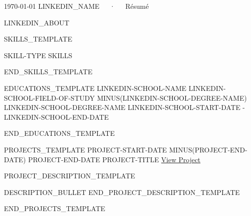\documentclass[10pt, a4paper]{awesome-cv}
\begin{document}
    \makecvheader[C]

    \makecvfooter
    {\today}
    {LINKEDIN_NAME~~~·~~~Résumé}
    {\thepage}



    \begin{cvparagraph}
        LINKEDIN_ABOUT
    \end{cvparagraph}


    SKILLS_TEMPLATE
    \begin{cvhonors}

        \cvhonor
        {SKILL-TYPE} %
        {SKILLS} %
        {} %
        {} %

    \end{cvhonors}
    END_SKILLS_TEMPLATE

    \begin{cventries}

        EDUCATIONS_TEMPLATE
        \cventry
        {LINKEDIN-SCHOOL-NAME}
        {LINKEDIN-SCHOOL-FIELD-OF-STUDY MINUS(LINKEDIN-SCHOOL-DEGREE-NAME) LINKEDIN-SCHOOL-DEGREE-NAME}
        {} %
        {LINKEDIN-SCHOOL-START-DATE - LINKEDIN-SCHOOL-END-DATE} %
        {
            \begin{cvitems} %
            \end{cvitems}
        }
        END_EDUCATIONS_TEMPLATE

    \end{cventries}

    \begin{cventries}


        PROJECTS_TEMPLATE
        \cventry
        {PROJECT-START-DATE MINUS(PROJECT-END-DATE) PROJECT-END-DATE}
        {PROJECT-TITLE} %
        {\href{PROJECT-LINK}{View Project}} %
        {}
        {
            \begin{cvitems} %
                PROJECT_DESCRIPTION_TEMPLATE
                \item {DESCRIPTION_BULLET}
                END_PROJECT_DESCRIPTION_TEMPLATE
            \end{cvitems}
        }
        END_PROJECTS_TEMPLATE

    \end{cventries}

\end{document}
